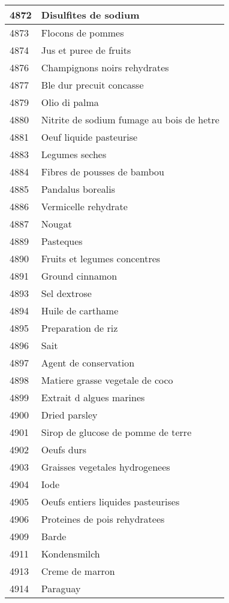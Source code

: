 \begin{longtable}{|l|l|}
4872 & Disulfites de sodium \\ \hline 
4873 & Flocons de pommes \\ \hline 
4874 & Jus et puree de fruits \\ \hline 
4876 & Champignons noirs rehydrates \\ \hline 
4877 & Ble dur precuit concasse \\ \hline 
4879 & Olio di palma \\ \hline 
4880 & Nitrite de sodium fumage au bois de hetre \\ \hline 
4881 & Oeuf liquide pasteurise \\ \hline 
4883 & Legumes seches \\ \hline 
4884 & Fibres de pousses de bambou \\ \hline 
4885 & Pandalus borealis \\ \hline 
4886 & Vermicelle rehydrate \\ \hline 
4887 & Nougat \\ \hline 
4889 & Pasteques \\ \hline 
4890 & Fruits et legumes concentres \\ \hline 
4891 & Ground cinnamon \\ \hline 
4893 & Sel dextrose \\ \hline 
4894 & Huile de carthame \\ \hline 
4895 & Preparation de riz \\ \hline 
4896 & Sait \\ \hline 
4897 & Agent de conservation \\ \hline 
4898 & Matiere grasse vegetale de coco \\ \hline 
4899 & Extrait d algues marines \\ \hline 
4900 & Dried parsley \\ \hline 
4901 & Sirop de glucose de pomme de terre \\ \hline 
4902 & Oeufs durs \\ \hline 
4903 & Graisses vegetales hydrogenees \\ \hline 
4904 & Iode \\ \hline 
4905 & Oeufs entiers liquides pasteurises \\ \hline 
4906 & Proteines de pois rehydratees \\ \hline 
4909 & Barde \\ \hline 
4911 & Kondensmilch \\ \hline 
4913 & Creme de marron \\ \hline 
4914 & Paraguay \\ \hline 

\end{longtable}
